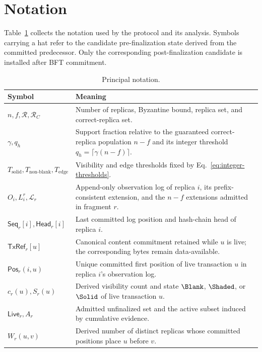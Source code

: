 \appendices
\section{Notation}
\label{app:notation}

Table~\ref{tab:notation} collects the notation used by the protocol and its analysis.  Symbols carrying a hat refer to the candidate pre-finalization state derived from the committed predecessor. Only the corresponding post-finalization candidate is installed after BFT commitment.

\begin{table}[t]
\centering
\caption{Principal notation.}
\label{tab:notation}
\renewcommand{\arraystretch}{1.08}
\begin{tabular}{p{}p{}}
\hline
\textbf{Symbol} & \textbf{Meaning} \\
\hline
$n,f,\mathcal R,\mathcal R_C$ & Number of replicas, Byzantine bound, replica set, and correct-replica set. \\
$\gamma,q_h$ & Support fraction relative to the guaranteed correct-replica population $n-f$ and its integer threshold $q_h=\lceil\gamma(n-f)\rceil$. \\
$T_{\mathrm{solid}},T_{\mathrm{non\mbox{-}blank}},T_{\mathrm{edge}}$ & Visibility and edge thresholds fixed by Eq.~\eqref{eq:integer-thresholds}. \\
$O_i,L_i^r,\mathcal L_r$ & Append-only observation log of replica $i$, its prefix-consistent extension, and the $n-f$ extensions admitted in fragment $r$. \\
$\mathsf{Seq}_r[i],\mathsf{Head}_r[i]$ & Last committed log position and hash-chain head of replica $i$. \\
$\mathsf{TxRef}_r[u]$ & Canonical content commitment retained while $u$ is live; the corresponding bytes remain data-available. \\
$\mathsf{Pos}_r(i,u)$ & Unique committed first position of live transaction $u$ in replica $i$'s observation log. \\
$c_r(u),S_r(u)$ & Derived visibility count and state $\Blank$, $\Shaded$, or $\Solid$ of live transaction $u$. \\
$\mathsf{Live}_r,A_r$ & Admitted unfinalized set and the active subset induced by cumulative evidence. \\
$W_r(u,v)$ & Derived number of distinct replicas whose committed positions place $u$ before $v$. \\

\end{tabular}
\end{table}

